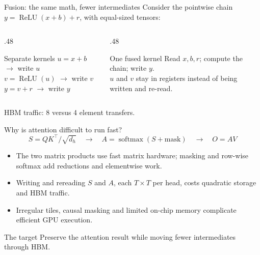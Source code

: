 \documentclass[handout]{beamer}
\begin{document}
\begin{frame}{Fusion: the same math, fewer intermediates}
  \small
  Consider the pointwise chain $y=\operatorname{ReLU}(x+b)+r$, with equal-sized tensors:
  \vspace{3pt}
  \begin{columns}[t]
    \begin{column}{.48\linewidth}
      \begin{alertblock}{Separate kernels}
        $u=x+b$ \quad $\rightarrow$ write $u$\\[3pt]
        $v=\operatorname{ReLU}(u)$ \quad $\rightarrow$ write $v$\\[3pt]
        $y=v+r$ \quad $\rightarrow$ write $y$
      \end{alertblock}
    \end{column}
    \begin{column}{.48\linewidth}
      \begin{block}{One fused kernel}
        Read $x,b,r$; compute the chain; write $y$.\\[5pt]
        $u$ and $v$ stay in registers instead of being written and re-read.
      \end{block}
    \end{column}
  \end{columns}
  \vfill
  HBM traffic: 8 versus 4 element transfers.
\end{frame}

\begin{frame}{Why is attention difficult to run fast?}
  \small
  \[
    S=QK^\top/\sqrt{d_h}\quad\longrightarrow\quad
    A=\operatorname{softmax}(S+\text{mask})\quad\longrightarrow\quad O=AV
  \]
  \begin{itemize}
      \setlength{\itemsep}{5pt}
    \item The two matrix products use fast matrix hardware; masking and row-wise softmax add reductions and elementwise work.
    \item Writing and rereading $S$ and $A$, each $T\times T$ per head, costs quadratic storage and HBM traffic.
    \item Irregular tiles, causal masking and limited on-chip memory complicate efficient GPU execution.
  \end{itemize}
  \begin{alertblock}{The target}
    Preserve the attention result while moving fewer intermediates through HBM.
  \end{alertblock}
\end{frame}
\end{document}
